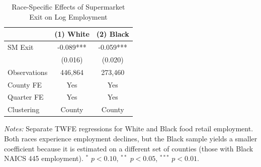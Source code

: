 \begin{table}[htbp]
\centering
\caption{Race-Specific Effects of Supermarket Exit on Log Employment}
\label{tab:race_specific}
\begin{tabular}{lcc}
\toprule
 & (1) White & (2) Black \\
\midrule
SM Exit & -0.089*** & -0.059*** \\
 & (0.016) & (0.020) \\
\addlinespace
Observations & 446,864 & 273,460 \\
County FE & Yes & Yes \\
Quarter FE & Yes & Yes \\
Clustering & County & County \\
\bottomrule
\end{tabular}
\begin{tablenotes}
\item \textit{Notes:} Separate TWFE regressions for White and Black food retail employment.
Both races experience employment declines, but the Black sample yields a smaller coefficient
because it is estimated on a different set of counties (those with Black NAICS 445 employment).
$^{*}$ $p < 0.10$, $^{**}$ $p < 0.05$, $^{***}$ $p < 0.01$.
\end{tablenotes}
\end{table}
